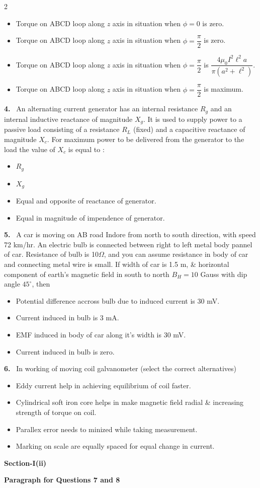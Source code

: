 \documentclass[10pt]{extarticle}
\newcommand{\sect}[1]{\par\smallskip\noindent\textbf{#1}\par}
\newcommand{\qn}[1]{\par\smallskip\noindent\textbf{#1.}~}
\newcommand{\paraq}[2]{\par\smallskip\noindent\textbf{Paragraph for Questions #1 and #2}\par}
\newenvironment{qoptions}{\begin{itemize}[leftmargin=1.8em,itemsep=1pt,topsep=2pt,label={}]}{\end{itemize}}
\newcommand{\opt}[2]{\item[(#1)] #2}
\begin{document}
\begin{multicols}{2}
\begin{qoptions}
\opt{A}{Torque on ABCD loop along $z$ axis in situation when $\phi=0$ is zero.}
\opt{B}{Torque on ABCD loop along $z$ axis in situation when $\phi=\dfrac{\pi}{2}$ is zero.}
\opt{C}{Torque on ABCD loop along $z$ axis in situation when $\phi=\dfrac{\pi}{2}$ is $\dfrac{4\mu_0 I^2\ell^2 a}{\pi\left(a^2+\ell^2\right)}$.}
\opt{D}{Torque on ABCD loop along $z$ axis in situation when $\phi=\dfrac{\pi}{2}$ is maximum.}
\end{qoptions}
\qn{4} An alternating current generator has an internal resistance $R_g$ and an internal inductive reactance of magnitude $X_g$. It is used to supply power to a passive load consisting of a resistance $R_L$ (fixed) and a capacitive reactance of magnitude $X_c$. For maximum power to be delivered from the generator to the load the value of $X_c$ is equal to :
\begin{qoptions}
\opt{A}{$R_g$}
\opt{B}{$X_g$}
\opt{C}{Equal and opposite of reactance of generator.}
\opt{D}{Equal in magnitude of impendence of generator.}
\end{qoptions}
\qn{5} A car is moving on AB road Indore from north to south direction, with speed 72 km/hr. An electric bulb is connected between right to left metal body pannel of car. Resistance of bulb is 10$\Omega$, and you can assume resistance in body of car and connecting metal wire is small. If width of car is 1.5 m, \& horizontal component of earth's magnetic field in south to north $B_H=10$ Gauss with dip angle $45^\circ$, then
\begin{qoptions}
\opt{A}{Potential difference accross bulb due to induced current is 30 mV.}
\opt{B}{Current induced in bulb is 3 mA.}
\opt{C}{EMF induced in body of car along it's width is 30 mV.}
\opt{D}{Current induced in bulb is zero.}
\end{qoptions}
\qn{6} In working of moving coil galvanometer (select the correct alternatives)
\begin{qoptions}
\opt{A}{Eddy current help in achieving equilibrium of coil faster.}
\opt{B}{Cylindrical soft iron core helps in make magnetic field radial \& increasing strength of torque on coil.}
\opt{C}{Parallex error needs to minized while taking measurement.}
\opt{D}{Marking on scale are equally spaced for equal change in current.}
\end{qoptions}
\sect{Section-I(ii)}
\paraq{7}{8}

\end{multicols}
\end{document}
